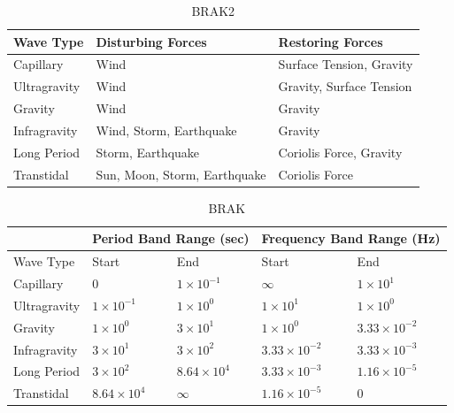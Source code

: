 \newcommand{\mvec}[1]{\mathbf{#1}}
\newcommand{\mvecx}[1]{\mathbf{#1}_x}
\newcommand{\mvecy}[1]{\mathbf{#1}_y}
\newcommand{\mvecz}[1]{\mathbf{#1}_z}
\newcommand{\mvecw}[1]{\mathbf{#1}_w}
\newcommand{\mmat}[1]{\mathbf{#1}}
\newcommand{\transpose}[1]{#1^{\mathsf{T}}}
\newcommand{\inverse}[1]{#1^{\mathsf{-1}}}
\newcommand{\normalise}[1]{\frac{#1}{\norm{#1}}}

\DeclarePairedDelimiter\abs{\lvert}{\rvert}
\DeclarePairedDelimiter\norm{\lVert}{\rVert}

\begin{table}
\label{tab:ocean_wave_force}
\begin{tabularx}{\textwidth}{X l X}
  \hline
  Wave Type & Disturbing Forces & Restoring Forces \\
 \hline
  Capillary    & Wind & Surface Tension, Gravity \\
  Ultragravity & Wind & Gravity, Surface Tension \\
  Gravity      & Wind & Gravity \\
  Infragravity & Wind, Storm, Earthquake & Gravity \\
  Long Period  & Storm, Earthquake & Coriolis Force, Gravity \\
  Transtidal   & Sun, Moon, Storm, Earthquake & Coriolis Force \\
\end{tabularx}
%
\caption{BRAK2}
\end{table}

\begin{table}
\label{tab:ocean_wave_period}
\begin{tabularx}{\textwidth}{X | X X | X X }
  \cline{2-5}
  & \multicolumn{2}{c}{Period Band Range (sec)} \vline & \multicolumn{2}{c}{Frequency Band Range (Hz)} \\
  \hline
  Wave Type & Start & End & Start & End \\
 \hline
  Capillary    & $0$                & $1\times10^{-1}$   & $\infty$            & $1\times10^1$ \\
  Ultragravity & $1\times10^{-1}$   & $1\times10^{0}$    & $1\times10^1$       & $1\times10^0$ \\
  Gravity      & $1\times10^{0}$    & $3\times10^{1}$    & $1\times10^0$       & $3.33\times10^{-2}$ \\
  Infragravity & $3\times10^{1}$    & $3\times10^{2}$    & $3.33\times10^{-2}$ & $3.33\times10^{-3}$ \\
  Long Period  & $3\times10^{2}$    & $8.64\times10^{4}$ & $3.33\times10^{-3}$ & $1.16\times10^{-5}$ \\
  Transtidal   & $8.64\times10^{4}$ & $\infty$           & $1.16\times10^{-5}$ & $0$
\end{tabularx}
%
\caption{BRAK}
\end{table}

